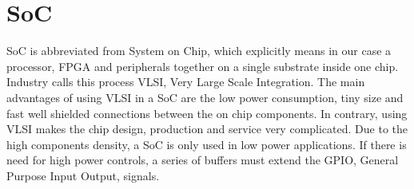 \documentclass[12pt,a4paper,english,twoside,openright]{tutthesis}
\begin{document}
	
	
	
	\section{SoC}
SoC is abbreviated from System on Chip, which explicitly means in our case a processor, FPGA and peripherals together on a single substrate inside one chip. Industry calls this process VLSI, Very Large Scale Integration. The main advantages of using VLSI in a SoC are the low power consumption, tiny size and fast well shielded connections between the on chip components. In contrary, using VLSI makes the chip design, production and service very complicated. Due to the high components density, a SoC is only used in low power applications. If there is need for high power controls, a series of buffers must extend the GPIO, General Purpose Input Output, signals.
\end{document}

